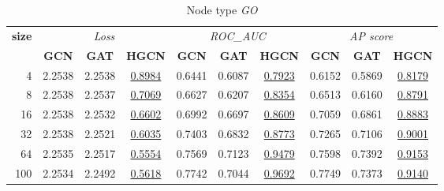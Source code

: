 \begin{table}
    \begin{subtable}[t]{\textwidth}
        \centering
        \begin{tabular}{r|ccc|ccc|ccc}   
             \toprule
                \multirow{2}{*}{\textbf{size}} & \multicolumn{3}{c|}{\textit{Loss}} & \multicolumn{3}{c|}{\textit{ROC\_AUC}} & \multicolumn{3}{c}{\textit{AP score}} \\
                & \textbf{GCN} & \textbf{GAT} & \textbf{HGCN} & \textbf{GCN} & \textbf{GAT} & \textbf{HGCN} & \textbf{GCN} & \textbf{GAT} & \textbf{HGCN} \\
                \midrule
                4 & 2.2538 & 2.2538 & \underline{0.8984} & 0.6441 & 0.6087 & \underline{0.7923} & 0.6152 & 0.5869 & \underline{0.8179} \\
                8 & 2.2538 & 2.2537 & \underline{0.7069} & 0.6627 & 0.6207 & \underline{0.8354} & 0.6513 & 0.6160 & \underline{0.8791} \\
                16 & 2.2538 & 2.2532 & \underline{0.6602} & 0.6992 & 0.6697 & \underline{0.8609} & 0.7059 & 0.6861 & \underline{0.8883} \\
                32 & 2.2538 & 2.2521 & \underline{0.6035} & 0.7403 & 0.6832 & \underline{0.8773} & 0.7265 & 0.7106 & \underline{0.9001} \\
                64 & 2.2535 & 2.2517 & \underline{0.5554} & 0.7569 & 0.7123 & \underline{0.9479} & 0.7598 & 0.7392 & \underline{0.9153} \\
                100 & 2.2534 & 2.2492 & \underline{0.5618} & 0.7742 & 0.7044 & \underline{0.9692} & 0.7749 & 0.7373 & \underline{0.9140} \\
                \bottomrule
        \end{tabular}
        \caption{Node type \textit{GO}}
    \end{subtable}
    
    \vspace{1em}
    

\end{table}
